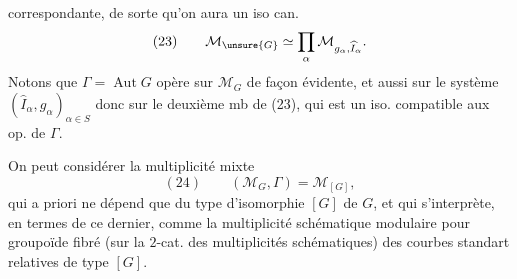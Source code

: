 correspondante,  de sorte qu'on aura un iso can.
\[
(23)\qquad\mathcal M_{\unsure{G}}\simeq\prod_\alpha\mathcal M_{g_\alpha,\widehat I_\alpha}.
\]
Notons que $\Gamma=\operatorname{Aut}G$ opère sur $\mathcal M_G$ de façon évidente, et aussi sur le système $(\widehat I_\alpha,g_\alpha)_{\alpha\in S}$ donc sur le deuxième mb de (23), qui est un iso. compatible aux op. de $\Gamma$.

On peut considérer la multiplicité mixte
\[
(24)\qquad(\mathcal M_G,\Gamma)=\mathcal M_{[G]},
\]
qui a priori ne dépend que du type d'isomorphie $[G]$ de $G$, et qui s'interprète, en termes de ce dernier, comme la multiplicité schématique modulaire pour  groupoïde fibré (sur la $2$-cat. des multiplicités schématiques) des courbes standart relatives de type $[G]$.
